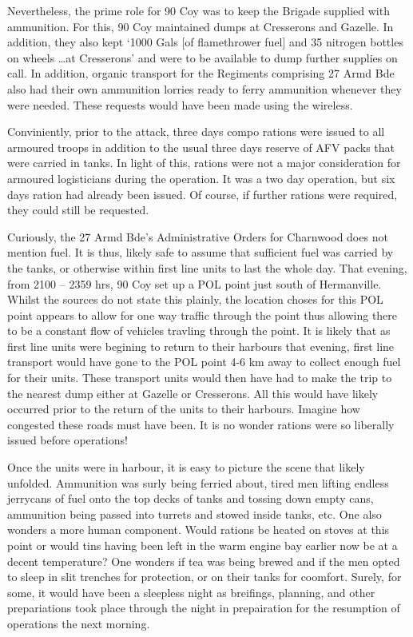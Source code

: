 \documentclass[noraggedright]{turabian-researchpaper}
\newcommand{\CharnAdm}{27 Armd Bde Adm Order No. 7, 7 July 1944}
\begin{document}
Nevertheless, the prime role for 90 Coy was to keep the Brigade supplied
with ammunition.  For this, 90 Coy maintained dumps at Cresserons and 
Gazelle.  In addition, they also kept `1000 Gals [of flamethrower fuel]
and 35 nitrogen bottles on wheels \ldots at Cresserons' and were to be
available to dump further supplies on call.\autocite[\CharnAdm][Para 6]
{27wd} In addition, organic transport for the Regiments comprising 27 Armd
Bde also had their own ammunition lorries ready to ferry ammunition whenever
they were needed.  These requests would have been made using the 
wireless.\autocite[13th/18th Royal Hussars Operation Order No. 1, Operation
Charnwood (See July appendix)][Para 9b]{1318wd}

Conviniently, prior to the attack, three days compo rations were issued to
all armoured troops in addition to the usual three days reserve of AFV
packs that were carried in tanks.\autocite[\CharnAdm][Para 7]{27wd}  
In light of this, rations were not a 
major consideration for armoured logisticians during the operation.  It was
a two day operation, but six days ration had already been issued.  Of course,
if further rations were required, they could still be requested.

Curiously, the 27 Armd Bde's Administrative Orders for Charnwood does not
mention fuel.  It is thus, likely safe to assume that sufficient fuel was
carried by the tanks, or otherwise within first line units to last the whole
day.  That evening, from 2100 -- 2359 hrs,
90 Coy set up a POL point just south of Hermanville.  
Whilst the sources do not state this plainly, the location choses for this
POL point appears to allow for one way traffic through the point thus allowing
there to be a constant flow of vehicles travling through the point.  It is 
likely that as first line units were begining to return to their harbours that 
evening, first line transport would have gone to the POL point 4-6 km away to 
collect enough fuel for their units.  These transport units would then have 
had to make the trip to the nearest dump either at Gazelle or Cresserons.  All
this would have likely occurred prior to the return of the units to their 
harbours.
Imagine how congested these roads must have been.  It is no wonder rations 
were so liberally issued before operations!   

Once the units were in harbour, it is easy to picture the scene that likely
unfolded.  Ammunition was surly being ferried about, tired men lifting 
endless jerrycans of fuel onto the top decks of tanks and tossing down empty
cans, ammunition being passed into turrets and stowed inside tanks, etc. 
One also wonders a more human
component.  Would rations be heated on stoves at this point or would tins 
having been left in the warm engine bay earlier now be at a decent 
temperature?  One wonders if tea was being brewed and if the men opted to sleep
in slit trenches for protection, or on their tanks for coomfort.  Surely, for
some, it would have been a sleepless night as breifings, planning, and other
prepariations took place through the night in  prepairation for the resumption 
of operations the next morning.
\end{document}
